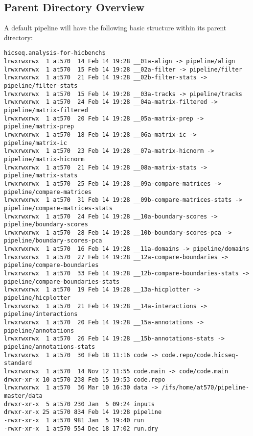 \subsection{Parent Directory Overview}
A default pipeline will have the following basic structure within its parent directory:
\begin{lstlisting}
hicseq.analysis-for-hicbench$
lrwxrwxrwx  1 at570  14 Feb 14 19:28 __01a-align -> pipeline/align
lrwxrwxrwx  1 at570  15 Feb 14 19:28 __02a-filter -> pipeline/filter
lrwxrwxrwx  1 at570  21 Feb 14 19:28 __02b-filter-stats -> pipeline/filter-stats
lrwxrwxrwx  1 at570  15 Feb 14 19:28 __03a-tracks -> pipeline/tracks
lrwxrwxrwx  1 at570  24 Feb 14 19:28 __04a-matrix-filtered -> pipeline/matrix-filtered
lrwxrwxrwx  1 at570  20 Feb 14 19:28 __05a-matrix-prep -> pipeline/matrix-prep
lrwxrwxrwx  1 at570  18 Feb 14 19:28 __06a-matrix-ic -> pipeline/matrix-ic
lrwxrwxrwx  1 at570  23 Feb 14 19:28 __07a-matrix-hicnorm -> pipeline/matrix-hicnorm
lrwxrwxrwx  1 at570  21 Feb 14 19:28 __08a-matrix-stats -> pipeline/matrix-stats
lrwxrwxrwx  1 at570  25 Feb 14 19:28 __09a-compare-matrices -> pipeline/compare-matrices
lrwxrwxrwx  1 at570  31 Feb 14 19:28 __09b-compare-matrices-stats -> pipeline/compare-matrices-stats
lrwxrwxrwx  1 at570  24 Feb 14 19:28 __10a-boundary-scores -> pipeline/boundary-scores
lrwxrwxrwx  1 at570  28 Feb 14 19:28 __10b-boundary-scores-pca -> pipeline/boundary-scores-pca
lrwxrwxrwx  1 at570  16 Feb 14 19:28 __11a-domains -> pipeline/domains
lrwxrwxrwx  1 at570  27 Feb 14 19:28 __12a-compare-boundaries -> pipeline/compare-boundaries
lrwxrwxrwx  1 at570  33 Feb 14 19:28 __12b-compare-boundaries-stats -> pipeline/compare-boundaries-stats
lrwxrwxrwx  1 at570  19 Feb 14 19:28 __13a-hicplotter -> pipeline/hicplotter
lrwxrwxrwx  1 at570  21 Feb 14 19:28 __14a-interactions -> pipeline/interactions
lrwxrwxrwx  1 at570  20 Feb 14 19:28 __15a-annotations -> pipeline/annotations
lrwxrwxrwx  1 at570  26 Feb 14 19:28 __15b-annotations-stats -> pipeline/annotations-stats
lrwxrwxrwx  1 at570  30 Feb 18 11:16 code -> code.repo/code.hicseq-standard
lrwxrwxrwx  1 at570  14 Nov 12 11:55 code.main -> code/code.main
drwxr-xr-x 10 at570 238 Feb 15 19:53 code.repo
lrwxrwxrwx  1 at570  36 Mar 10 16:30 data -> /ifs/home/at570/pipeline-master/data
drwxr-xr-x  5 at570 230 Jan  5 09:24 inputs
drwxr-xr-x 25 at570 834 Feb 14 19:28 pipeline
-rwxr-xr-x  1 at570 981 Jan  5 19:40 run
-rwxr-xr-x  1 at570 554 Dec 18 17:02 run.dry
\end{lstlisting}



